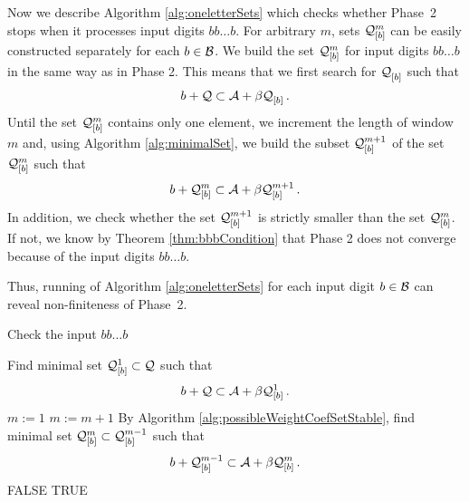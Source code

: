 

\begin{upravit}
 Now we describe Algorithm \ref{alg:oneletterSets} which checks whether Phase~2 stops when it processes input digits $bb\dots b$.
For arbitrary $m$, sets $\mathcal{Q}_{[\scriptstyle b]}^{\scriptstyle m}$  can be easily constructed separately for each $b\in\mathcal{B}$. We build the set $\mathcal{Q}_{[\scriptstyle b]}^{\scriptstyle m}$ for input digits $bb\dots b$ in the same way as in Phase 2. This means that we first search for $\mathcal{Q}_{[\scriptstyle b]}^{\scriptstyle }$ such that 
$$
b + \mathcal{Q} \subset \mathcal{A} + \beta \mathcal{Q}_{[\scriptstyle b]}^{\scriptstyle }\,.
$$
Until the set $\mathcal{Q}_{[\scriptstyle b]}^{\scriptstyle m}$ contains only one element, we increment the length of  window $m$ and, using Algorithm \ref{alg:minimalSet}, we build the subset $\mathcal{Q}_{[\scriptstyle b]}^{\scriptstyle m+1}$ of the set $\mathcal{Q}_{[\scriptstyle b]}^{\scriptstyle m}$ such that
$$
b + \mathcal{Q}_{[\scriptstyle b]}^{\scriptstyle m} \subset \mathcal{A} + \beta \mathcal{Q}_{[\scriptstyle b]}^{\scriptstyle m+1}\,.
$$
In addition, we check whether the set $\mathcal{Q}_{[\scriptstyle b]}^{\scriptstyle m+1}$ is strictly smaller than the set $\mathcal{Q}_{[\scriptstyle b]}^{\scriptstyle m}$. If not, we know by Theorem \ref{thm:bbbCondition} that Phase 2 does not converge because of the input digits $bb\dots b$.

Thus, running of Algorithm \ref{alg:oneletterSets} for each input digit $b\in\mathcal{B}$ can reveal non-finiteness of Phase~2.

\end{upravit}

\begin{algorithm}
  \caption{Check the input $bb\dots b$}
    \label{alg:oneletterSets}
  \begin{algorithmic}[1]
    \STATE Find minimal set $\mathcal{Q}_{[\scriptstyle b]}^{\scriptstyle 1} \subset \mathcal{Q}$ such that
      $$
      b + \mathcal{Q} \subset \mathcal{A} + \beta \mathcal{Q}_{[\scriptstyle b]}^{\scriptstyle 1}\,.
      $$
      \vspace{-20pt}
    \STATE $m:=1$
        \STATE $m:= m +1$
        \STATE By Algorithm \ref{alg:possibleWeightCoefSetStable}, find minimal set $\mathcal{Q}_{[\scriptstyle b]}^{\scriptstyle m} \subset \mathcal{Q}_{[\scriptstyle b]}^{\scriptstyle m-1}$ such that
          $$
          b + \mathcal{Q}_{[\scriptstyle b]}^{\scriptstyle m-1} \subset \mathcal{A} + \beta \mathcal{Q}_{[\scriptstyle b]}^{\scriptstyle m}\,.
          $$  
          \vspace{-20pt}
            \RETURN FALSE
        \ENDIF
    \ENDWHILE  
    \RETURN TRUE
  \end{algorithmic}
\end{algorithm}



